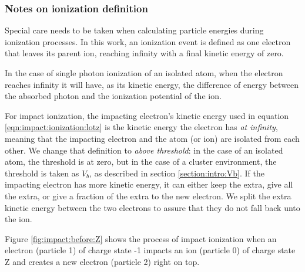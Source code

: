 

\subsubsection{Notes on ionization definition}
\label{section:intro:mechanisms:notes}
Special care needs to be taken when calculating particle energies during
ionization processes. In this work, an ionization event is defined as one
electron that leaves its parent ion, reaching infinity with a final kinetic
energy of zero.

In the case of single photon ionization of an isolated atom, when the electron
reaches infinity it will have, as its kinetic energy, the difference of energy
between the absorbed photon and the ionization potential of the ion.

For impact ionization, the impacting electron's kinetic energy used in equation
\eqref{eqn:impact:ionization:lotz} is the kinetic energy the electron has
\textit{at infinity}, meaning that the impacting electron and the atom (or ion)
are isolated from each other. We change that definition to \textit{above
threshold}: in the case of an isolated atom, the threshold is at zero, but in the
case of a cluster environment, the threshold is taken as $V_b$, as described in
section \ref{section:intro:Vb}. If the impacting electron has more kinetic
energy, it can either keep the extra, give all the extra, or give a fraction of
the extra to the new electron. We split the extra kinetic energy between the two
electrons to assure that they do not fall back unto the ion.


Figure \ref{fig:impact:before:Z} shows the process of impact ionization when an
electron (particle 1) of charge state -1 impacts an ion (particle 0) of charge
state Z and creates a new electron (particle 2) right on top.

